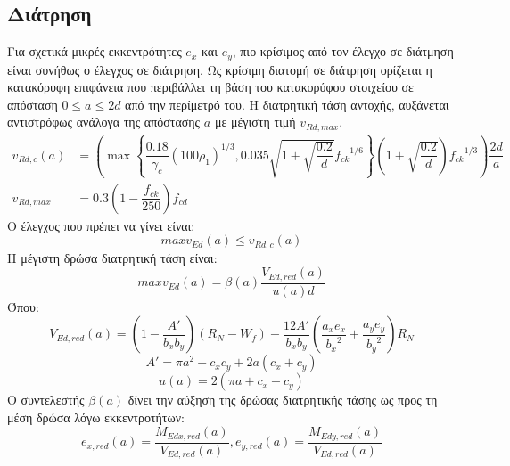 \subsection{Διάτρηση}
Για σχετικά μικρές εκκεντρότητες $e_x$ και $e_y$, πιο κρίσιμος από τον έλεγχο σε διάτμηση είναι συνήθως ο έλεγχος σε διάτρηση. Ως κρίσιμη διατομή σε διάτρηση ορίζεται η κατακόρυφη επιφάνεια που περιβάλλει τη βάση του κατακορύφου στοιχείου σε απόσταση $0 \leq a \leq 2d$ από την περίμετρό του. Η διατρητική τάση αντοχής, αυξάνεται αντιστρόφως ανάλογα της απόστασης $a$ με μέγιστη τιμή $v_{Rd,max}$.
\begin{subequations}
\begin{align}
  v_{Rd,c}\left(a\right) & = \left(\max\left\{\dfrac{0.18}{{\gamma}_c}\left(100{\rho}_1\right)^{1/3}, 0.035\sqrt{1 + \sqrt{\dfrac{0.2}{d}}}{f_{ck}}^{1/6}\right\}\left(1 + \sqrt{\dfrac{0.2}{d}}\right){f_{ck}}^{1/3}\right)\dfrac{2d}{a}\label{eqn:28a}\\[5pt]
  v_{Rd,max} & = 0.3\left(1 - \dfrac{f_{ck}}{250}\right)f_{cd}\label{eqn:28b}
\end{align}
\end{subequations}
\noindent
Ο έλεγχος που πρέπει να γίνει είναι:
\begin{equation}
  maxv_{Ed}\left(a\right) \leq v_{Rd,c}\left(a\right)\label{eqn:29}
\end{equation}
Η μέγιστη δρώσα διατρητική τάση είναι:
\begin{equation}
  maxv_{Ed}\left(a\right) = \beta\left(a\right)\dfrac{V_{Ed,red}\left(a\right)}{u\left(a\right)d}\label{eqn:210}
\end{equation}
Όπου:
\begin{equation}
  V_{Ed,red}\left(a\right) = \left(1-\dfrac{A'}{b_x b_y}\right)\left(R_N - W_f\right) - \dfrac{12A'}{b_x b_y}\left(\dfrac{a_x e_x}{{b_x}^2} + \dfrac{a_y e_y}{{b_y}^2}\right)R_N\label{eqn:211}
\end{equation}
\begin{equation}
  A' = \pi a^2 + c_x c_y + 2a\left(c_x + c_y\right)\label{eqn:212}
\end{equation}
\begin{equation}
  u \left(a\right) = 2\left(\pi a + c_x + c_y\right)\label{eqn:213}
\end{equation}
Ο συντελεστής $\beta\left(a\right)$ δίνει την αύξηση της δρώσας διατρητικής τάσης ως προς τη μέση δρώσα λόγω εκκεντροτήτων:
\begin{equation}
  e_{x,red}\left(a\right) = \dfrac{M_{Edx,red}\left(a\right)}{V_{Ed,red}\left(a\right)} ,e_{y,red}\left(a\right) = \dfrac{M_{Edy,red}\left(a\right)}{V_{Ed,red}\left(a\right)}\label{eqn:214}
\end{equation}

